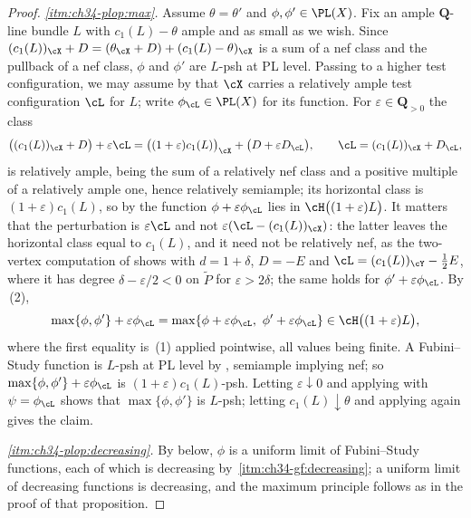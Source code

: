 \begin{proof}
\emph{\cref{itm:ch34-plop:max}.}  Assume $\theta=\theta'$ and
$\phi,\phi'\in\PL(X)$.  Fix an ample $\mathbf Q$-line bundle $L$ with
$c_1(L)-\theta$ ample and as small as we wish.  Since
$(c_1(L))_{\cX}+D=(\theta_{\cX}+D)+(c_1(L)-\theta)_{\cX}$ is a sum of a
nef class and the pullback of a nef class, $\phi$ and $\phi'$ are
$L$-psh at PL level.  Passing to a higher test configuration, we may
assume by \cite[Lemma~2.33]{BJ22} that $\cX$ carries a relatively ample
test configuration $\cL$ for $L$; write $\phi_{\cL}\in\PL(X)$ for its
function.  For $\varepsilon\in\mathbf Q_{>0}$ the class
\[
 \bigl((c_1(L))_{\cX}+D\bigr)+\varepsilon\cL
 =\bigl((1+\varepsilon)c_1(L)\bigr)_{\cX}+\bigl(D+\varepsilon D_{\cL}\bigr),
 \qquad \cL=(c_1(L))_{\cX}+D_{\cL},
\]
is relatively ample, being the sum of a relatively nef class and a positive
multiple of a relatively ample one, hence relatively semiample; its
horizontal class is $(1+\varepsilon)c_1(L)$, so by
 the function
$\phi+\varepsilon\phi_{\cL}$ lies in $\cH\bigl((1+\varepsilon)L\bigr)$.
It matters that the perturbation is $\varepsilon\cL$ and not
$\varepsilon(\cL-(c_1(L))_{\cX})$: the latter leaves the horizontal class
equal to $c_1(L)$, and it need not be relatively nef, as the two-vertex
computation of  shows with $d=1+\delta$,
$D=-E$ and $\cL=(c_1(L))_{\cY}-\tfrac12E$, where it has degree
$\delta-\varepsilon/2<0$ on $\widetilde P$ for $\varepsilon>2\delta$;
the same holds for $\phi'+\varepsilon\phi_{\cL}$.  By
\,(2),
\[
 \max\{\phi,\phi'\}+\varepsilon\phi_{\cL}
 =\max\{\phi+\varepsilon\phi_{\cL},\ \phi'+\varepsilon\phi_{\cL}\}
 \in\cH\bigl((1+\varepsilon)L\bigr),
\]
where the first equality is \,(1) applied
pointwise, all values being finite.  A Fubini--Study function is
$L$-psh at PL level by , semiample
implying nef; so $\max\{\phi,\phi'\}+\varepsilon\phi_{\cL}$ is
$(1+\varepsilon)c_1(L)$-psh.  Letting $\varepsilon\downarrow0$ and
applying  with
$\psi=\phi_{\cL}$ shows that $\max\{\phi,\phi'\}$ is $L$-psh; letting
$c_1(L)\downarrow\theta$ and applying
 again gives the claim.

\emph{\cref{itm:ch34-plop:decreasing}.}  By
 below, $\phi$ is a uniform limit of
Fubini--Study functions, each of which is decreasing by
\,\cref{itm:ch34-gf:decreasing}; a uniform
limit of decreasing functions is decreasing, and the maximum principle
follows as in the proof of that proposition.


\end{proof}
